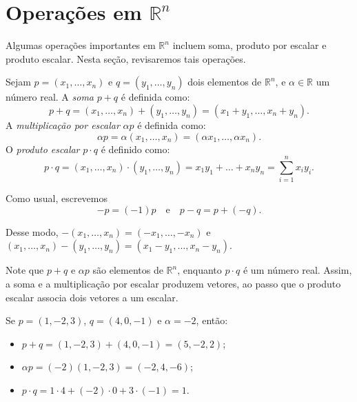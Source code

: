 \section{Operações em \texorpdfstring{$\mathbb R^n$}{Rn}}

Algumas operações importantes em $\mathbb R^n$ incluem soma, produto por escalar e produto escalar.
Nesta seção, revisaremos tais operações.

\begin{definition}
    Sejam $p=(x_1, \ldots, x_n)$ e $q=(y_1, \ldots, y_n)$ dois elementos de $\mathbb R^n$, e $\alpha \in \mathbb R$ um número real.
    A \emph{soma} $p+q$ é definida como:
    \begin{equation*}
        p+q =(x_1, \ldots, x_n)+(y_1, \ldots, y_n)=(x_1+y_1, \ldots, x_n+y_n).
    \end{equation*}
    A \emph{multiplicação por escalar} $\alpha p$ é definida como:
    \begin{equation*}
        \alpha p = \alpha (x_1, \ldots, x_n) = (\alpha x_1, \ldots, \alpha x_n).
    \end{equation*}
    O \emph{produto escalar} $p \cdot q$ é definido como:
    \begin{equation*}
        p \cdot q = (x_1, \ldots, x_n) \cdot (y_1, \ldots, y_n) = x_1y_1 + \ldots + x_ny_n=\sum_{i=1}^n x_iy_i.
    \end{equation*}
\end{definition}

Como usual, escrevemos
\[
    -p=(-1)p
    \quad\text{e}\quad
    p-q=p+(-q).
\]

Desse modo, $-(x_1, \ldots, x_n) = (-x_1, \ldots, -x_n)$ e $(x_1, \ldots, x_n)-(y_1, \ldots, y_n) = (x_1-y_1, \ldots, x_n-y_n)$.

Note que $p+q$ e $\alpha p$ são elementos de $\mathbb R^n$, enquanto $p\cdot q$ é um número real.
Assim, a soma e a multiplicação por escalar produzem vetores, ao passo que o produto escalar associa dois vetores a um escalar.

\begin{example}
    Se $p=(1,-2,3)$, $q=(4,0,-1)$ e $\alpha=-2$, então:
    \begin{itemize}
        \item $p+q=(1,-2,3)+(4,0,-1)=(5,-2,2)$;
        \item $\alpha p=(-2)(1,-2,3)=(-2,4,-6)$;
        \item $p\cdot q=1\cdot4+(-2)\cdot0+3\cdot(-1)=1$.
    \end{itemize}
\end{example}

